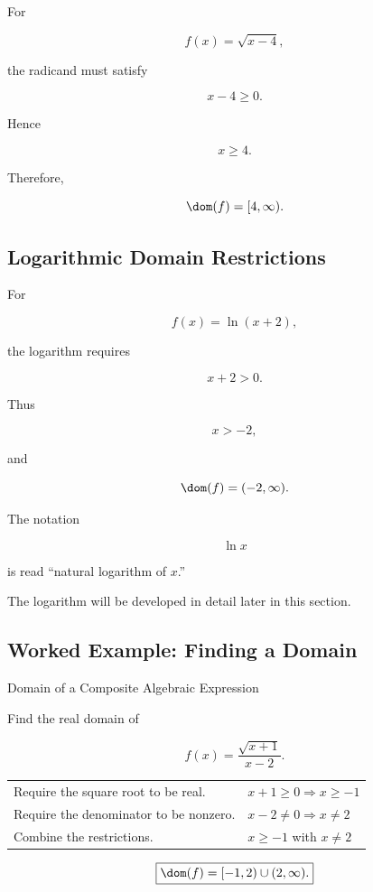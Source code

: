 For

\[ f(x)=\sqrt{x-4}, \]

the radicand must satisfy

\[ x-4\geq0. \]

Hence

\[ x\geq4. \]

Therefore,

\[ \dom(f)=[4,\infty). \]

\subsection{Logarithmic Domain Restrictions}
\label{subsec:log-domain-restrictions}

For

\[ f(x)=\ln(x+2), \]

the logarithm requires

\[ x+2>0. \]

Thus

\[ x>-2, \]

and

\[ \dom(f)=(-2,\infty). \]

The notation

\[ \ln x \]

is read ``natural logarithm of \(x\).''

The logarithm will be developed in detail later in this section.

\subsection{Worked Example: Finding a Domain}
\label{subsec:worked-domain}

\begin{workedexamplebox}{Domain of a Composite Algebraic Expression}

Find the real domain of

\[ f(x)=\frac{\sqrt{x+1}}{x-2}. \]

\begin{tabularx}{\textwidth}{@{}>{\raggedright\arraybackslash}p{}X@{}}
Require the square root to be real. &
\(x+1\geq0\Rightarrow x\geq-1\)\\
Require the denominator to be nonzero. &
\(x-2\neq0\Rightarrow x\neq2\)\\
Combine the restrictions. &
\(x\geq-1\) with \(x\neq2\)
\end{tabularx}

\begin{answerbox}
\[ \boxed{\dom(f)=[-1,2)\cup(2,\infty).} \]
\end{answerbox}
\end{workedexamplebox}

